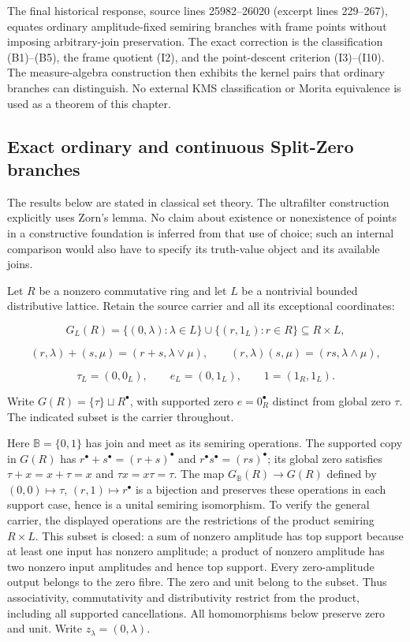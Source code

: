 The final historical response, source lines 25982--26020 (excerpt lines
229--267), equates ordinary amplitude-fixed semiring branches with frame
points without imposing arbitrary-join preservation. The exact correction
is the classification (B1)--(B5), the frame quotient (I2), and the
point-descent criterion (I3)--(I10). The measure-algebra construction then
exhibits the kernel pairs that ordinary branches can distinguish. No
external KMS classification or Morita equivalence is used as a theorem
of this chapter.

\subsection{Exact ordinary and continuous Split-Zero branches}\label{historical-support-exact-ordinary-and-continuous-split-zero-branches}

The results below are stated in classical set theory. The ultrafilter construction explicitly uses Zorn's lemma. No claim about existence or nonexistence of points in a constructive foundation is inferred from that use of choice; such an internal comparison would also have to specify its truth-value object and its available joins.

Let \(R\) be a nonzero commutative ring and let \(L\) be a nontrivial bounded distributive lattice. Retain the source carrier and all its exceptional coordinates:

\[
G_L(R)=\{(0,\lambda):\lambda\in L\}\cup\{(r,1_L):r\in R\}\subseteq R\times L,
\]

\[
(r,\lambda)+(s,\mu)=(r+s,\lambda\vee\mu),\qquad
(r,\lambda)(s,\mu)=(rs,\lambda\wedge\mu),
\]

\[
\tau_L=(0,0_L),\qquad e_L=(0,1_L),\qquad1=(1_R,1_L).
\]

Write \(G(R)=\{\tau\}\sqcup R^\bullet\), with supported zero \(e=0_R^\bullet\) distinct from global zero \(\tau\). The indicated subset is the carrier throughout.

Here \(\mathbb B=\{0,1\}\) has join and meet as its semiring operations.
The supported copy in \(G(R)\) has
\(r^\bullet+s^\bullet=(r+s)^\bullet\) and
\(r^\bullet s^\bullet=(rs)^\bullet\); its global zero satisfies
\(\tau+x=x+\tau=x\) and \(\tau x=x\tau=\tau\).
The map \(G_{\mathbb B}(R)\to G(R)\) defined by
\((0,0)\mapsto\tau\), \((r,1)\mapsto r^\bullet\) is a bijection and
preserves these operations in each support case, hence is a unital semiring
isomorphism. To verify the general carrier, the displayed operations are
the restrictions of the product semiring \(R\times L\). This subset is
closed: a sum of nonzero amplitude has top support because at least one
input has nonzero amplitude; a product of nonzero amplitude has two
nonzero input amplitudes and hence top support. Every zero-amplitude
output belongs to the zero fibre. The zero and unit belong to the subset.
Thus associativity, commutativity and distributivity restrict from the
product, including all supported cancellations. All homomorphisms below
preserve zero and unit. Write \(z_\lambda=(0,\lambda)\).

